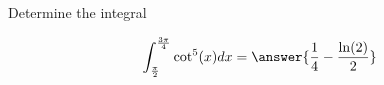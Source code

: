 \documentclass{ximera}
\author{Jason Miller}
\begin{document}
\begin{exercise}
Determine the integral

\[
\int_{\frac{\pi}{2}}^{\frac{3\pi}{4}} \cot^{5}(x) dx=\answer{ \frac{1}{4}-\frac{ \ln(2)}{2}}
\]


\end{exercise}
\end{document}
